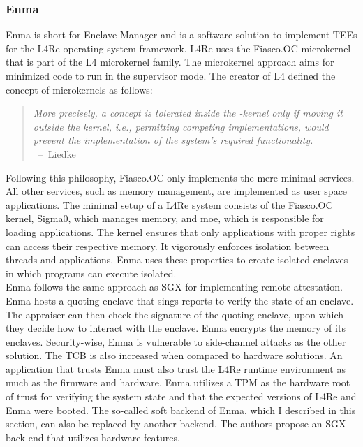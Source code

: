\subsubsection{Enma}
\label{sec:20:enma}
Enma is short for Enclave Manager and is a software solution to implement TEEs
for the L4Re operating system framework. \cite{reitz_isolierende_2019} L4Re uses
the Fiasco.OC microkernel that is part of the L4 microkernel family. The
microkernel approach aims for minimized code to run in the supervisor mode. The
creator of L4 defined the concept of microkernels as follows:

\begin{quote}
    \textit{ More precisely, a concept is tolerated inside the \mu-kernel only
        if moving it outside the kernel, i.e., permitting competing
        implementations, would prevent the implementation of the system's
        required functionality. \\
    } \mbox{ -- Liedke\cite{liedtke1995micro}}
\end{quote}


Following this philosophy, Fiasco.OC only implements the mere minimal services.
All other services, such as memory management, are implemented as user space
applications. The minimal setup of a L4Re system consists of the Fiasco.OC
kernel, Sigma0, which manages memory, and moe, which is responsible for loading
applications. The kernel ensures that only applications with proper rights can
access their respective memory. It vigorously enforces isolation between threads
and applications. Enma uses these properties to create isolated enclaves in
which programs can execute isolated.\\

Enma follows the same approach as SGX for implementing remote attestation. Enma
hosts a quoting enclave that sings reports to verify the state of an enclave.
The appraiser can then check the signature of the quoting enclave, upon which
they decide how to interact with the enclave. Enma encrypts the memory of its
enclaves. Security-wise, Enma is vulnerable to side-channel attacks as the other
solution. The TCB is also increased when compared to hardware solutions. An
application that trusts Enma must also trust the L4Re runtime environment as
much as the firmware and hardware. Enma utilizes a TPM as the hardware root of
trust for verifying the system state and that the expected versions of L4Re and
Enma were booted. The so-called soft backend of Enma, which I described in this
section, can also be replaced by another backend. The authors propose an SGX
back end that utilizes hardware features.

